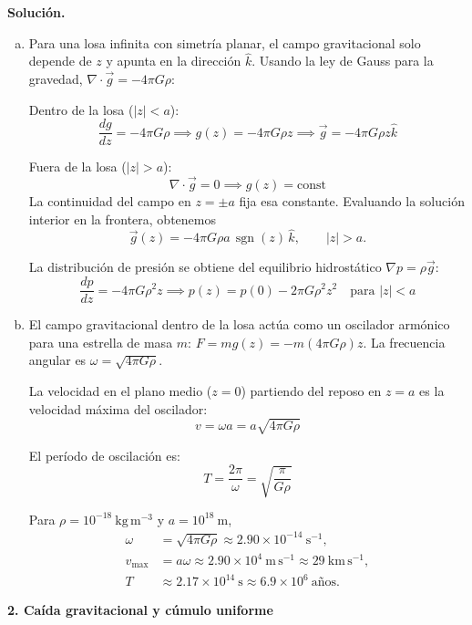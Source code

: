 \textbf{Solución.}
\begin{enumerate}[a)]
    \item Para una losa infinita con simetría planar, el campo gravitacional solo depende de $z$ y apunta en la dirección $\hat{k}$. Usando la ley de Gauss para la gravedad, $\nabla \cdot \vec{g} = -4\pi G \rho$:
    
    Dentro de la losa ($|z| < a$):
    $$ \frac{dg}{dz} = -4\pi G \rho \implies g(z) = -4\pi G \rho z \implies \vec{g} = -4\pi G \rho z \hat{k} $$
    
    Fuera de la losa ($|z| > a$):
    $$ \nabla \cdot \vec{g} = 0 \implies g(z) = \text{const} $$
    La continuidad del campo en $z=\pm a$ fija esa constante. Evaluando la solución interior en la frontera, obtenemos
    $$ \vec{g}(z) = -4\pi G \rho a\,\operatorname{sgn}(z)\,\hat{k}, \qquad |z|>a. $$
    
    La distribución de presión se obtiene del equilibrio hidrostático $\nabla p = \rho \vec{g}$:
    $$ \frac{dp}{dz} = -4\pi G \rho^2 z \implies p(z) = p(0) - 2\pi G \rho^2 z^2 \quad \text{para } |z| < a $$

    \item El campo gravitacional dentro de la losa actúa como un oscilador armónico para una estrella de masa $m$: $F = m g(z) = -m(4\pi G \rho)z$. La frecuencia angular es $\omega = \sqrt{4\pi G \rho}$.
    
    La velocidad en el plano medio ($z=0$) partiendo del reposo en $z=a$ es la velocidad máxima del oscilador:
    $$ v = \omega a = a\sqrt{4\pi G \rho} $$
    
    El período de oscilación es:
    $$ T = \frac{2\pi}{\omega} = \sqrt{\frac{\pi}{G \rho}} $$

    Para $\rho=10^{-18}\ \mathrm{kg\,m^{-3}}$ y $a=10^{18}\ \mathrm{m}$,
    $$
    \begin{aligned}
    \omega&=\sqrt{4\pi G\rho}
    \approx2.90\times10^{-14}\ \mathrm{s^{-1}},\\
    v_{\max}&=a\omega
    \approx2.90\times10^4\ \mathrm{m\,s^{-1}}
    \approx29\ \mathrm{km\,s^{-1}},\\
    T&\approx2.17\times10^{14}\ \mathrm{s}
    \approx6.9\times10^6\ \text{años}.
    \end{aligned}
    $$

    \figuraOsciladorLosa
\end{enumerate}

\medskip
{\large\bfseries 2. Caída gravitacional y cúmulo uniforme\par}
\smallskip

